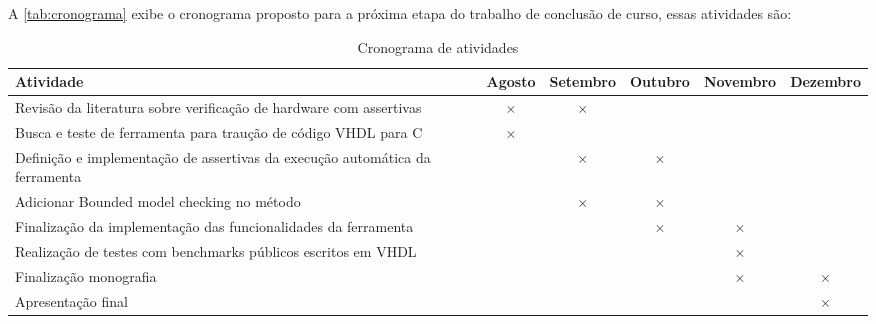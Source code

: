 A \autoref{tab:cronograma} exibe o cronograma proposto para a próxima etapa do trabalho de conclusão de curso, essas atividades são:

\label{chapter:cronograma}
\begin{table}[htbp]
  \centering
  \caption{Cronograma de atividades}
  \label{tab:cronograma}
  \begin{tabularx}{\textwidth}{|X|c|c|c|c|c|}
    \hline
    \textbf{Atividade} & \textbf{Agosto} & \textbf{Setembro} & \textbf{Outubro} & \textbf{Novembro} & \textbf{Dezembro} \\
    \hline
    Revisão da literatura sobre verificação de hardware com assertivas & \(\times\) & \(\times\) & & & \\
    \hline
    Busca e teste de ferramenta para traução de código VHDL para C & \(\times\) & & & & \\
    \hline
    Definição e implementação de assertivas da execução automática da ferramenta & & \(\times\) & \(\times\) & & \\
    \hline
    Adicionar Bounded model checking no método & & \(\times\) & \(\times\) & &  \\
    \hline
    Finalização da implementação das funcionalidades da ferramenta & & & \(\times\) & \(\times\) &  \\
    \hline
    Realização de testes com benchmarks públicos escritos em VHDL & & &  & \(\times\) & \\
    \hline
    Finalização monografia & & & & \(\times\) & \(\times\) \\
    \hline
    Apresentação final & & & &  & \(\times\) \\
    \hline
  \end{tabularx}
\end{table}